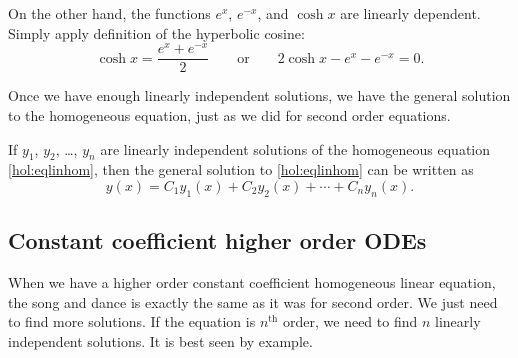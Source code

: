 \begin{example}
On the other hand, the functions $e^x$, $e^{-x}$, and $\cosh x$ are linearly
dependent.  Simply apply definition of the hyperbolic cosine:
\begin{equation*}
\cosh x = \frac{e^x + e^{-x}}{2} 
\qquad
\text{or}
\qquad
2 \cosh x - e^x - e^{-x} = 0.
\end{equation*}
\end{example}

Once we have enough linearly independent solutions, we have the general
solution to the homogeneous equation, just as we did for second order
equations.

\begin{theorem}
If $y_1$, $y_2$, \ldots, $y_n$ are linearly independent solutions of the
homogeneous equation \eqref{hol:eqlinhom}, then
the general solution to 
\eqref{hol:eqlinhom} can be written as
\begin{equation*}
y(x) = C_1 y_1(x) + C_2 y_2(x) + \cdots + C_n y_n(x) .
\end{equation*}
\end{theorem}

\subsection{Constant coefficient higher order ODEs}

When we have a higher order constant coefficient homogeneous linear
equation, the song and dance is exactly the same as it was for second order.
We just need to find more solutions.  If the equation is
$n^{\text{th}}$ order, we need to find $n$ linearly independent solutions.
It is best seen by example.

